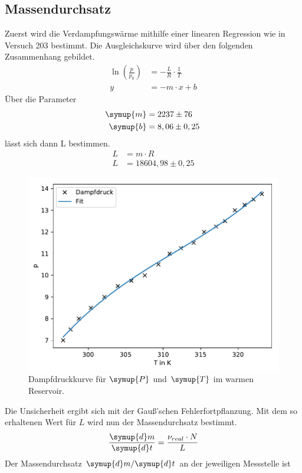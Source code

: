 \subsection{Massendurchsatz}
Zuerst wird die Verdampfungswärme mithilfe einer linearen Regression wie in Versuch 203 bestimmt.
Die Ausgleichskurve wird über den folgenden Zusammenhang gebildet.
\begin{align*}
    \ln(\frac{p}{p_0})&= -\frac{L}{R}\cdot\frac{1}{T}\\
    y &= -m \cdot x +b
\end{align*}
Über die Parameter
\begin{align*}
  \symup{m} &= 2237\pm76 \\
  \symup{b} &= 8,06\pm0,25 \:
\end{align*}
lässt sich dann L bestimmen.
\begin{align*}
    L &= m\cdot R\\
    L &= 18604,98 \pm 0,25
\end{align*}
\begin{figure}[H]
  \includegraphics{build/plot_L.pdf}
  \caption{Dampfdruckkurve für $\symup{P}$ und $\symup{T}$ im warmen Reservoir.}
  \label{fig:Dampfp}
\end{figure}
Die Unsicherheit ergibt sich mit der Gauß'schen Fehlerfortpflanzung.
Mit dem so erhaltenen Wert für $L$ wird nun der Massendurchsatz bestimmt.
\begin{equation*}
    \frac{\symup{d}m}{\symup{d}t} = \frac{\nu_{real}\cdot N}{L}
\end{equation*}
Der Massendurchsatz $\symup{d}m / \symup{d}t$ an der jeweiligen Messstelle ist
